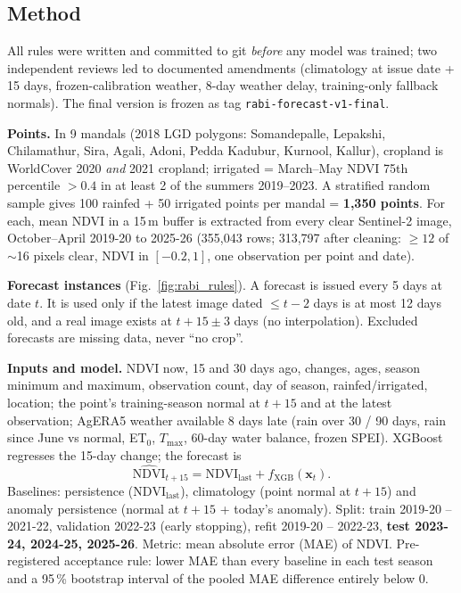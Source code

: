 \documentclass[11pt,a4paper,oneside]{article}
\begin{document}
\subsection{Method}
All rules were written and committed to git \emph{before} any model was trained; two independent reviews led to documented amendments (climatology at issue date + 15 days, frozen-calibration weather, 8-day weather delay, training-only fallback normals). The final version is frozen as tag \texttt{rabi-forecast-v1-final}.

\textbf{Points.} In 9 mandals (2018 LGD polygons: Somandepalle, Lepakshi, Chilamathur, Sira, Agali, Adoni, Pedda Kadubur, Kurnool, Kallur), cropland is WorldCover 2020 \emph{and} 2021 cropland; irrigated = March--May NDVI 75th percentile $> 0.4$ in at least 2 of the summers 2019--2023. A stratified random sample gives 100 rainfed + 50 irrigated points per mandal = \textbf{1,350 points}. For each, mean NDVI in a 15\,m buffer is extracted from every clear Sentinel-2 image, October--April 2019-20 to 2025-26 (355,043 rows; 313,797 after cleaning: $\ge 12$ of $\sim$16 pixels clear, NDVI in $[-0.2, 1]$, one observation per point and date).

\textbf{Forecast instances} (Fig.~\ref{fig:rabi_rules}). A forecast is issued every 5 days at date $t$. It is used only if the latest image dated $\le t-2$ days is at most 12 days old, and a real image exists at $t+15 \pm 3$ days (no interpolation). Excluded forecasts are missing data, never ``no crop''.

\textbf{Inputs and model.} NDVI now, 15 and 30 days ago, changes, ages, season minimum and maximum, observation count, day of season, rainfed/irrigated, location; the point's training-season normal at $t+15$ and at the latest observation; AgERA5 weather available 8 days late (rain over 30 / 90 days, rain since June vs normal, ET$_0$, $T_{\max}$, 60-day water balance, frozen SPEI). XGBoost regresses the 15-day change; the forecast is
\begin{equation}
\widehat{\mathrm{NDVI}}_{t+15} = \mathrm{NDVI}_{\text{last}} + f_{\text{XGB}}(\mathbf{x}_t).
\end{equation}
Baselines: persistence ($\mathrm{NDVI}_{\text{last}}$), climatology (point normal at $t+15$) and anomaly persistence (normal at $t+15$ + today's anomaly). Split: train 2019-20 -- 2021-22, validation 2022-23 (early stopping), refit 2019-20 -- 2022-23, \textbf{test 2023-24, 2024-25, 2025-26}. Metric: mean absolute error (MAE) of NDVI. Pre-registered acceptance rule: lower MAE than every baseline in each test season and a 95\,\% bootstrap interval of the pooled MAE difference entirely below 0.
\end{document}
